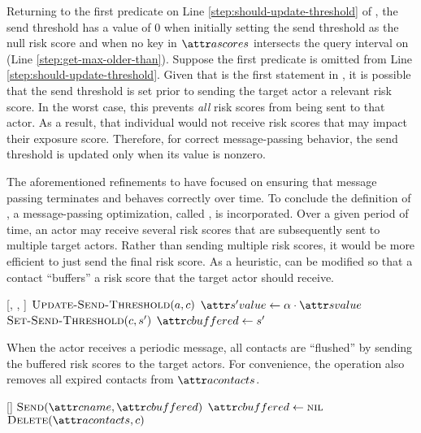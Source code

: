 Returning to the first predicate on Line \ref{step:should-update-threshold} of \cUpdateSendThreshold, the send threshold has a value of 0 when initially setting the send threshold as the null risk score and when no key in $\aActorScores$ intersects the query interval on (Line \ref{step:get-max-older-than}). Suppose the first predicate is omitted from Line \ref{step:should-update-threshold}. Given that \cUpdateSendThreshold is the first statement in \cApplyRiskScore, it is possible that the send threshold is set prior to sending the target actor a relevant risk score. In the worst case, this prevents \emph{all} risk scores from being sent to that actor. As a result, that individual would not receive risk scores that may impact their exposure score. Therefore, for correct message-passing behavior, the send threshold is updated only when its value is nonzero.

The aforementioned refinements to \cApplyRiskScore have focused on ensuring that message passing terminates and behaves correctly over time. To conclude the definition of \cApplyRiskScore, a message-passing optimization, called  \citep{McCune2015}, is incorporated. Over a given period of time, an actor may receive several risk scores that are subsequently sent to multiple target actors. Rather than sending multiple risk scores, it would be more efficient to just send the final risk score. As a heuristic, \cApplyRiskScore can be modified so that a contact ``buffers'' a risk score that the target actor should receive.

\begin{function}{\nApplyRiskScore}[\vActor, \vContact, \vScore]
  \State $\cUpdateSendThreshold[\vActor, \vContact]$
  \If{$\aContactThresholdValue < \aScoreValue \AND \aContactTime + \pTimeBuffer > \aScoreTime$}
    \State $\aNewScoreValue \assign \pTransmissionRate \cdot \aScoreValue$
    \State $\cSetSendThreshold[\vContact, \vNewScore]$
    \If{$\aContactName \notEquals \aScoreSender$}
      \State $\aContactBuffered \assign \vNewScore$
    \EndIf
  \EndIf
\end{function}

When the actor receives a periodic  message, all contacts are ``flushed'' by sending the buffered risk scores to the target actors. For convenience, the \cHandleFlushTimeout operation also removes all expired contacts from $\aActorContacts$. 

\begin{function}[H]{\nHandleFlushTimeout}[\vActor]
  \ForEach{$\vContact \in \aActorContacts$}
    \If{$\aContactBuffered \notEquals \nil$}
      \State $\cSend[\aContactName, \aContactBuffered]$
      \State $\aContactBuffered \assign \nil$
    \EndIf
      \State $\cDelete[\aActorContacts, \vContact]$
    \EndIf
  \EndFor
\end{function}


